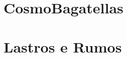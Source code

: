 \documentclass[
	12pt,				%
	openright,			%
	twoside,			%
	a4paper,			%
	english,			%
	french,				%
	spanish,			%
	brazil				%
	]{abntex2}
\begin{document}
\chapter{CosmoBagatellas}


\chapter{Lastros e Rumos}







\postextual

%

%
%










\end{document}
